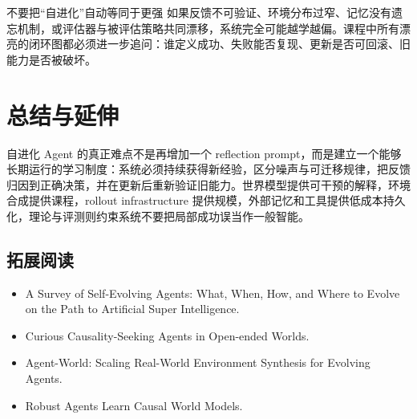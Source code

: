 \documentclass[a4paper]{article}
\begin{document}
\begin{warningbox}{不要把“自进化”自动等同于更强}
如果反馈不可验证、环境分布过窄、记忆没有遗忘机制，或评估器与被评估策略共同漂移，系统完全可能越学越偏。课程中所有漂亮的闭环图都必须进一步追问：谁定义成功、失败能否复现、更新是否可回滚、旧能力是否被破坏。
\end{warningbox}


\section{总结与延伸}

自进化 Agent 的真正难点不是再增加一个 reflection prompt，而是建立一个能够长期运行的学习制度：系统必须持续获得新经验，区分噪声与可迁移规律，把反馈归因到正确决策，并在更新后重新验证旧能力。世界模型提供可干预的解释，环境合成提供课程，rollout infrastructure 提供规模，外部记忆和工具提供低成本持久化，理论与评测则约束系统不要把局部成功误当作一般智能。

\subsection{拓展阅读}

\begin{itemize}
    \item A Survey of Self-Evolving Agents: What, When, How, and Where to Evolve on the Path to Artificial Super Intelligence.
    \item Curious Causality-Seeking Agents in Open-ended Worlds.
    \item Agent-World: Scaling Real-World Environment Synthesis for Evolving Agents.
    \item Robust Agents Learn Causal World Models.
\end{itemize}
\end{document}
